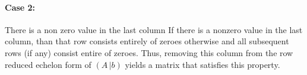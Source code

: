 \begin{enumerate}
\paragraph{Case 2:}  There is a non zero value in the last column
If there is a nonzero value in the last column, than that row consists
entirely of zeroes otherwise and all subsequent rows (if any) consist
entire of zeroes.  Thus, removing this column from the row reduced
echelon form of $(A\,|b)$ yields a
matrix that satisfies this property.
\end{enumerate}
